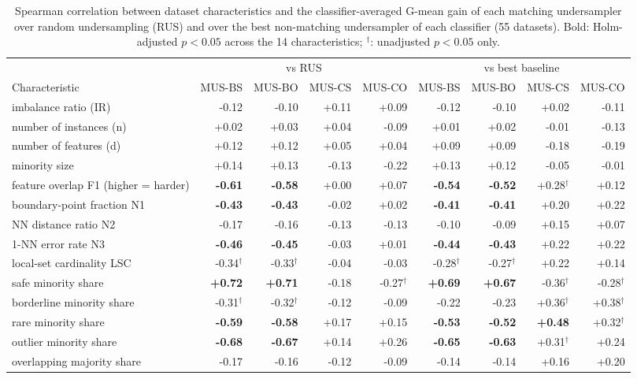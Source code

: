 \begin{table}[t]
\centering
\footnotesize
\caption{Spearman correlation between dataset characteristics and the classifier-averaged G-mean gain of each matching undersampler over random undersampling (RUS) and over the best non-matching undersampler of each classifier (55 datasets). Bold: Holm-adjusted $p<0.05$ across the 14 characteristics; $^{\dagger}$: unadjusted $p<0.05$ only.}
\label{tab:meta_gain_corr}
\begin{adjustbox}{max width=\linewidth}
\begin{tabular}{lrrrrrrrr}
\toprule
 & \multicolumn{4}{c}{vs RUS} & \multicolumn{4}{c}{vs best baseline} \\
\cmidrule(lr){2-5} \cmidrule(lr){6-9}
Characteristic & MUS-BS & MUS-BO & MUS-CS & MUS-CO & MUS-BS & MUS-BO & MUS-CS & MUS-CO \\
\midrule
imbalance ratio (IR) & -0.12 & -0.10 & +0.11 & +0.09 & -0.12 & -0.10 & +0.02 & -0.11 \\
number of instances (n) & +0.02 & +0.03 & +0.04 & -0.09 & +0.01 & +0.02 & -0.01 & -0.13 \\
number of features (d) & +0.12 & +0.12 & +0.05 & +0.04 & +0.09 & +0.09 & -0.18 & -0.19 \\
minority size & +0.14 & +0.13 & -0.13 & -0.22 & +0.13 & +0.12 & -0.05 & -0.01 \\
feature overlap F1 (higher = harder) & \textbf{-0.61} & \textbf{-0.58} & +0.00 & +0.07 & \textbf{-0.54} & \textbf{-0.52} & +0.28$^{\dagger}$ & +0.12 \\
boundary-point fraction N1 & \textbf{-0.43} & \textbf{-0.43} & -0.02 & +0.02 & \textbf{-0.41} & \textbf{-0.41} & +0.20 & +0.22 \\
NN distance ratio N2 & -0.17 & -0.16 & -0.13 & -0.13 & -0.10 & -0.09 & +0.15 & +0.07 \\
1-NN error rate N3 & \textbf{-0.46} & \textbf{-0.45} & -0.03 & +0.01 & \textbf{-0.44} & \textbf{-0.43} & +0.22 & +0.22 \\
local-set cardinality LSC & -0.34$^{\dagger}$ & -0.33$^{\dagger}$ & -0.04 & -0.03 & -0.28$^{\dagger}$ & -0.27$^{\dagger}$ & +0.22 & +0.14 \\
safe minority share & \textbf{+0.72} & \textbf{+0.71} & -0.18 & -0.27$^{\dagger}$ & \textbf{+0.69} & \textbf{+0.67} & -0.36$^{\dagger}$ & -0.28$^{\dagger}$ \\
borderline minority share & -0.31$^{\dagger}$ & -0.32$^{\dagger}$ & -0.12 & -0.09 & -0.22 & -0.23 & +0.36$^{\dagger}$ & +0.38$^{\dagger}$ \\
rare minority share & \textbf{-0.59} & \textbf{-0.58} & +0.17 & +0.15 & \textbf{-0.53} & \textbf{-0.52} & \textbf{+0.48} & +0.32$^{\dagger}$ \\
outlier minority share & \textbf{-0.68} & \textbf{-0.67} & +0.14 & +0.26 & \textbf{-0.65} & \textbf{-0.63} & +0.31$^{\dagger}$ & +0.24 \\
overlapping majority share & -0.17 & -0.16 & -0.12 & -0.09 & -0.14 & -0.14 & +0.16 & +0.20 \\
\bottomrule
\end{tabular}
\end{adjustbox}
\end{table}
